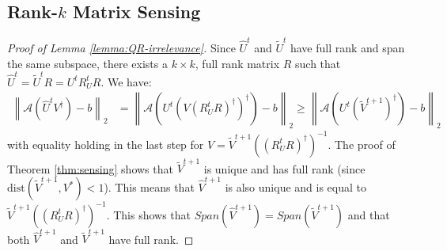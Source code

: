 \documentclass[11pt]{article}
\theoremstyle{plain}
\theoremstyle{definition}
\newcommand{\dist}{\mathrm{dist}}
\newcommand{\twonorm}[1]{\left\| {#1} \right\|_2}
\newcommand{\aff}{{\mathcal A}}
\newcommand{\Vht}{\widehat{V}^{t+1}}
\newcommand{\Uht}{\widehat{U}^{t}}
\begin{document}
\subsection{Rank-$k$ Matrix Sensing}\label{app:sensingk}
\begin{proof}[Proof of Lemma \ref{lemma:QR-irrelevance}]
Since $\Uht$ and $\widetilde{U}^t$ have full rank and span the same subspace, there exists a $k\times k$, full rank matrix $R$ such that $\Uht = \widetilde{U}^t R = U^t R_U^t R$.
  We have:
  \begin{align*}
    \twonorm{\aff\left(\Uht V^{\dag}\right)-b} &= \twonorm{\aff\left(U^t \left(V\left(R_U^tR\right)^{\dag}\right)^{\dag}\right)-b}
    \geq \twonorm{\aff\left(U^t \left(\widetilde{V}^{t+1}\right)^{\dag}\right)-b}
  \end{align*}
with equality holding in the last step for $V=\widetilde{V}^{t+1}\left(\left(R_U^t R\right)^{\dag}\right)^{-1}$.
The proof of Theorem \ref{thm:sensing} shows that $\widetilde{V}^{t+1}$ is unique and has full rank (since $\dist\left(\widetilde{V}^{t+1},V^*\right)<1$).
This means that $\Vht$ is also unique and is equal to $\widetilde{V}^{t+1}\left(\left(R_U^t R\right)^{\dag}\right)^{-1}$.
This shows that $Span\left(\Vht\right) = Span\left(\widetilde{V}^{t+1}\right)$ and that both $\Vht$ and $\widetilde{V}^{t+1}$ have full rank.
\end{proof}
\end{document}
